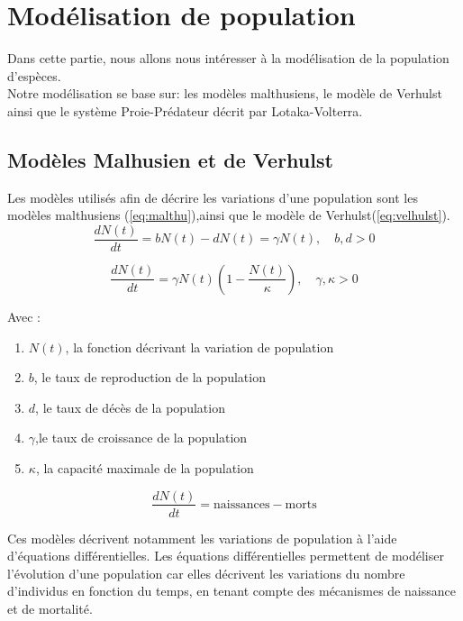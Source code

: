 \section{Modélisation de population}
Dans cette partie, nous allons nous intéresser à la modélisation de la population d'espèces.\\
Notre modélisation se base sur: les modèles malthusiens, le modèle de Verhulst ainsi que le système Proie-Prédateur décrit par Lotaka-Volterra.


\subsection{Modèles Malhusien et de Verhulst} 
Les modèles utilisés afin de décrire les variations d'une population sont les modèles malthusiens (\ref{eq:malthu}),ainsi que le modèle de Verhulst(\ref{eq:velhulst}).\\


\begin{equation}
\frac{dN(t)}{dt} = bN(t) - dN(t) = \gamma N(t), \quad b, d > 0
\label{eq:malthu}
\end{equation}

\begin{equation}
\frac{dN(t)}{dt} = \gamma N(t) \left(1 - \frac{N(t)}{\kappa} \right), \quad \gamma, \kappa > 0 
\label{eq:velhulst}
\end{equation}


Avec :
\begin{enumerate}
\item $N(t)$, la fonction décrivant la variation de population
\item  $b$, le taux de reproduction de la population
\item $d$, le taux de décès de la population
\item $\gamma$,le taux de croissance de la population 
\item $\kappa$, la capacité maximale de la population
\end{enumerate}


\[
\frac{dN(t)}{dt} = \text{naissances} - \text{morts}
\]

Ces modèles décrivent notamment les variations de population à l'aide d'équations différentielles.
Les équations différentielles permettent de modéliser l'évolution d'une population car elles décrivent les variations du nombre d'individus en fonction du temps, en tenant compte des mécanismes de naissance et de mortalité.

